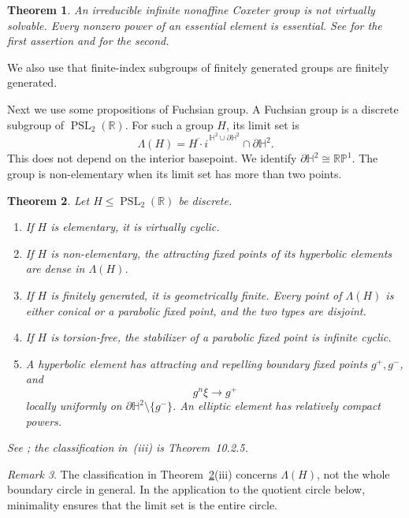 \documentclass[11pt,reqno]{amsart}
\newcommand{\R}{\mathbb{R}}
\theoremstyle{plain}
\newtheorem{theorem}{Theorem}[section]
\theoremstyle{definition}
\theoremstyle{remark}
\newtheorem{remark}[theorem]{Remark}
\numberwithin{equation}{section}
\begin{document}
\begin{theorem}\label{thm:coxeter-structure}
An irreducible infinite nonaffine Coxeter group is not virtually solvable. Every nonzero power of an essential element is essential. See \cite{Cashen,Qi2007} for the first assertion and \cite[Proposition~2.4]{Hollenbach2022} for the second.
\end{theorem}

We also use that finite-index subgroups of finitely generated groups are finitely generated.

Next we use some propositions of Fuchsian group. A Fuchsian group is a discrete subgroup of $\operatorname{PSL}_2(\R)$. For such a group $H$, its limit set is
\[
\Lambda(H)=\overline{H\cdot i}^{\,\mathbb H^2\cup\partial\mathbb H^2}
\cap\partial\mathbb H^2.
\]
This does not depend on the interior basepoint. We identify $\partial\mathbb H^2\cong\mathbb{RP}^1$. The group is non-elementary when its limit set has more than two points.


\begin{theorem}\label{thm:fuchsian-facts}
Let $H\leq\operatorname{PSL}_2(\R)$ be discrete.
\begin{enumerate}
\item If $H$ is elementary, it is virtually cyclic.
\item If $H$ is non-elementary, the attracting fixed points of its hyperbolic elements are dense in $\Lambda(H)$.
\item If $H$ is finitely generated, it is geometrically finite. Every point of $\Lambda(H)$ is either conical or a parabolic fixed point, and the two types are disjoint.
\item If $H$ is torsion-free, the stabilizer of a parabolic fixed point is infinite cyclic.
\item A hyperbolic element has attracting and repelling boundary fixed points $g^+,g^-$, and
\[
g^n\xi\longrightarrow g^+
\]
locally uniformly on $\partial\mathbb H^2\setminus\{g^-\}$. An elliptic element has relatively compact powers.
\end{enumerate}
See \cite{Beardon1983}; the classification in~(iii) is Theorem~10.2.5.
\end{theorem}

\begin{remark}
The classification in Theorem~\ref{thm:fuchsian-facts}(iii) concerns $\Lambda(H)$, not the whole boundary circle in general. In the application to the quotient circle below, minimality ensures that the limit set is the entire circle.
\end{remark}
\end{document}
